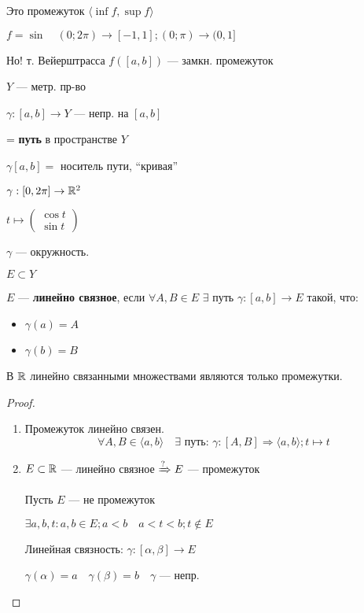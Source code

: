     \begin{remark}
        Это промежуток $\langle \inf f, \sup f \rangle$
    \end{remark}
    \begin{remark}
        $f=\sin \quad (0; 2\pi)\to [-1, 1]; (0; \pi)\to (0, 1]$

        Но! т. Вейерштрасса $f([a,b])$ --- замкн. промежуток
    \end{remark}
    \begin{definition}
        $Y$ --- метр. пр-во
        
        $\gamma: [a,b]\to Y$ --- непр. на $[a,b]$

        = \textbf{путь} в пространстве $Y$

        $\gamma[a,b] = $ носитель пути, ``кривая''
    \end{definition}
    \begin{example}
        $\gamma : [0, 2\pi]\to\mathbb{R}^2$

        $t\mapsto \begin{pmatrix}
            \cos t \\
            \sin t
        \end{pmatrix}$

        $\gamma$ --- окружность.
    \end{example}
    \begin{definition}
        $E\subset Y$

        $E$ --- \textbf{линейно связное}, если $\forall A,B\in E$
        $\exists$ путь $\gamma:[a,b]\to E$ такой, что:
        \begin{itemize}
            \item $\gamma(a)=A$
            \item $\gamma(b)=B$
        \end{itemize}
    \end{definition}
    \begin{lemma}
        В $\mathbb{R}$ линейно связанными множествами являются только промежутки.
    \end{lemma}
    \begin{proof}
        \begin{enumerate}
            \item Промежуток линейно связен.
            $$\forall A, B\in \langle a,b \rangle \quad \exists \text{ путь: } \gamma:[A,B]\Rightarrow \langle a,b \rangle; t\mapsto t$$
            \item $E\subset\mathbb{R}$ --- линейно связное $\xRightarrow{?} E$ --- промежуток
            
            Пусть $E$ --- не промежуток

            $\exists a,b,t : a,b\in E; a<b \quad a<t<b; t\not\in E$

            Линейная связность: $\gamma:[\alpha, \beta]\to E$

            $\gamma(\alpha)=a \quad \gamma(\beta)=b \quad \gamma$ --- непр.
        \end{enumerate}
    \end{proof}
